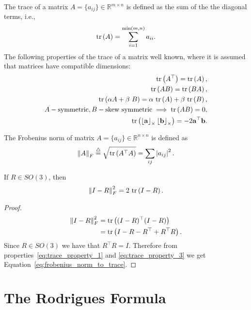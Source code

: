 The trace of a matrix $A=\{a_{ij}\}\in\mathbb{R}^{m\times n}$ is defined as the sum of the the diagonal terms, i.e.,
\[
\text{tr}\left(A\right) = \sum_{i=1}^{\min(m,n)} a_{ii}.
\]
The following properties of the trace of a matrix well known, where it is assumed that matrices have compatible dimensions:
\begin{align}
\trace{A^\top} =\trace{A}, \label{eq:trace_property_1} \\
\trace{AB} = \trace{BA}, \label{eq:trace_property_2} \\
\trace{\alpha A + \beta~B} = \alpha~\trace{A} + \beta~\trace{B}, \label{eq:trace_property_3} \\
A-\text{symmetric}, B-\text{skew symmetric} \implies \trace{AB} = 0, \label{eq:trace_property_4} \\
\trace{\ss{\abf} \ss{\bbf}} = -2\abf^\top \bbf. \label{eq:trace_property_5}
\end{align}


The Frobenius norm of matrix $A=\{a_{ij}\}\in\mathbb{R}^{n\times n}$ is defined as
\[
\left\|A\right\|_F \stackrel{\triangle}{=} \sqrt{\text{tr}\left(A^\top A\right)} = \sum_{ij} \left|a_{ij}\right|^2.
\]
\begin{lemma} \label{lem:norm_to_trace}
If $R\in SO(3)$, then 
\begin{equation}\label{eq:frobenius_norm_to_trace}
\norm{I-R}_F^2 = 2~\trace{I-R}.
\end{equation}
\end{lemma}
\begin{proof}
\begin{align*}
\left\|I-R\right\|_F^2 &= \text{tr}\left((I-R)^\top(I-R)\right) \\
  	&= \text{tr}\left(I - R - R^\top + R^\top R\right).
\end{align*}
Since $R\in SO(3)$ we have that $R^\top R = I$.  Therefore from properties~\eqref{eq:trace_property_1} and \eqref{eq:trace_property_3} we get Equation~\eqref{eq:frobenius_norm_to_trace}.
\end{proof}


\section{The Rodrigues Formula}
\label{sec:rodrigues_formula}

